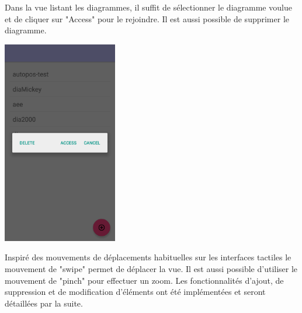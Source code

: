 Dans la vue listant les diagrammes, il suffit de sélectionner le diagramme voulue et de cliquer sur "Access" pour le rejoindre. Il est aussi possible de supprimer le diagramme.\par
		\begin{minipage}{\linewidth}
			\centering
			\includegraphics[width=5cm]{img/screen/colladia_workspaces_select}
    \end{minipage}

Inspiré des mouvements de déplacements habituelles sur les interfaces tactiles le mouvement de "swipe" permet de déplacer la vue. Il est aussi possible d'utiliser le mouvement de "pinch" pour effectuer un zoom.
Les fonctionnalités d'ajout, de suppression et de modification d'éléments ont été implémentées et seront détaillées par la suite.
	
